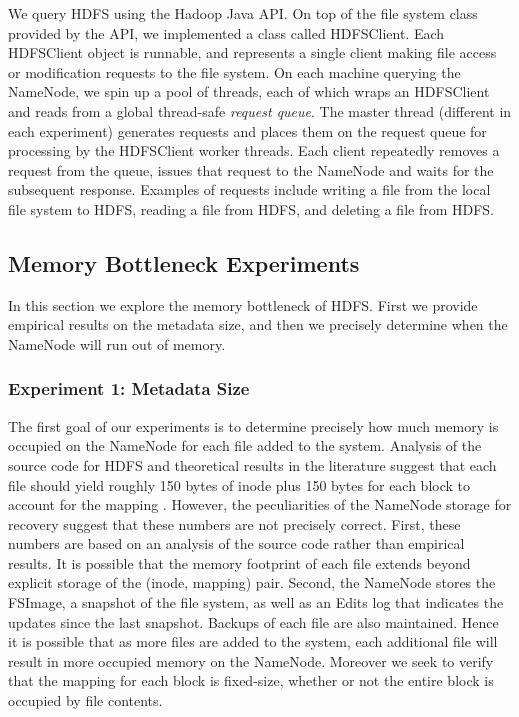 \documentclass[11pt, a4paper]{article}
\begin{document}
\begin{multicols*}{2}
We query HDFS using the Hadoop Java API. On top of the file system class provided by the API, we implemented a class called HDFSClient. Each HDFSClient object is runnable, and represents a single client making file access or modification requests to the file system. On each machine querying the NameNode, we spin up a pool of threads, each of which wraps an HDFSClient and reads from a global thread-safe \textit{request queue}. The master thread (different in each experiment) generates requests and places them on the request queue for processing by the HDFSClient worker threads. Each client repeatedly removes a request from the queue, issues that request to the NameNode and waits for the subsequent response. Examples of requests include writing a file from the local file system to HDFS, reading a file from HDFS, and deleting a file from HDFS.

\subsection{Memory Bottleneck Experiments}
In this section we explore the memory bottleneck of HDFS. First we provide empirical results on the metadata size, and then we precisely determine when the NameNode will run out of memory.
\subsubsection{Experiment 1: Metadata Size}\label{MetadataSize}
The first goal of our experiments is to determine precisely how much memory is occupied on the NameNode for each file added to the system. Analysis of the source code for HDFS and theoretical results in the literature suggest that each file should yield roughly 150 bytes of inode plus 150 bytes for each block to account for the mapping \cite{HdfsArch, HdfsScale}. However, the peculiarities of the NameNode storage for recovery suggest that these numbers are not precisely correct. First, these numbers are based on an analysis of the source code rather than empirical results. It is possible that the memory footprint of each file extends beyond explicit storage of the (inode, mapping) pair. Second, the NameNode stores the FSImage, a snapshot of the file system, as well as an Edits log that indicates the updates since the last snapshot. Backups of each file are also maintained. Hence it is possible that as more files are added to the system, each additional file will result in more occupied memory on the NameNode. Moreover we seek to verify that the mapping for each block is fixed-size, whether or not the entire block is occupied by file contents.


\end{multicols*}
\end{document}
